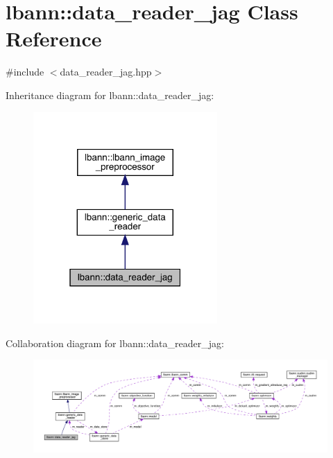 \hypertarget{classlbann_1_1data__reader__jag}{}\section{lbann\+:\+:data\+\_\+reader\+\_\+jag Class Reference}
\label{classlbann_1_1data__reader__jag}


{\ttfamily \#include $<$data\+\_\+reader\+\_\+jag.\+hpp$>$}



Inheritance diagram for lbann\+:\+:data\+\_\+reader\+\_\+jag\+:\nopagebreak
\begin{figure}[H]
\begin{center}
\leavevmode
\includegraphics[width=199pt]{classlbann_1_1data__reader__jag__inherit__graph}
\end{center}
\end{figure}


Collaboration diagram for lbann\+:\+:data\+\_\+reader\+\_\+jag\+:\nopagebreak
\begin{figure}[H]
\begin{center}
\leavevmode
\includegraphics[width=350pt]{classlbann_1_1data__reader__jag__coll__graph}
\end{center}
\end{figure}
